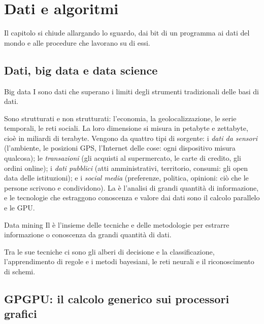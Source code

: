 \section{Dati e algoritmi}

Il capitolo si chiude allargando lo sguardo, dai bit di un programma ai dati
del mondo e alle procedure che lavorano su di essi.

\subsection{Dati, big data e data science}

\begin{definition}{Big data}
I  sono dati che superano i limiti degli strumenti tradizionali
delle basi di dati.
\end{definition}

Sono strutturati e non strutturati: l'economia, la geolocalizzazione, le serie
temporali, le reti sociali. La loro dimensione si misura in petabyte e
zettabyte, cioè in miliardi di terabyte. Vengono da quattro tipi di sorgente: i
\emph{dati da sensori} (l'ambiente, le posizioni GPS, l'Internet delle cose:
ogni dispositivo misura qualcosa); le \emph{transazioni} (gli acquisti al
supermercato, le carte di credito, gli ordini online); i \emph{dati pubblici}
(atti amministrativi, territorio, consumi: gli open data delle istituzioni); e
i \emph{social media} (preferenze, politica, opinioni: ciò che le persone
scrivono e condividono). La  è l'analisi di grandi quantità
di informazione, e le tecnologie che estraggono conoscenza e valore dai dati
sono il calcolo parallelo e le GPU.

\begin{definition}{Data mining}
Il  è l'insieme delle tecniche e delle metodologie per
estrarre informazione o conoscenza da grandi quantità di dati.
\end{definition}

Tra le sue tecniche ci sono gli alberi di decisione e la classificazione,
l'apprendimento di regole e i metodi bayesiani, le reti neurali e il
riconoscimento di schemi.

\subsection{GPGPU: il calcolo generico sui processori grafici}

